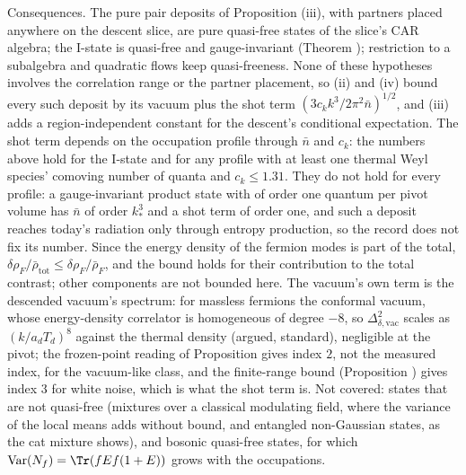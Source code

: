 Consequences. The pure pair deposits of Proposition (iii), with partners placed anywhere on the descent slice, are pure quasi-free states of the slice's CAR algebra; the I-state is quasi-free and gauge-invariant (Theorem ); restriction to a subalgebra and quadratic flows keep quasi-freeness. None of these hypotheses involves the correlation range or the partner placement, so (ii) and (iv) bound every such deposit by its vacuum plus the shot term $(3c_{k}k^{3}/2\pi^{2}\bar n)^{1/2}$, and (iii) adds a region-independent constant for the descent's conditional expectation. The shot term depends on the occupation profile through $\bar n$ and $c_{k}$: the numbers above hold for the I-state and for any profile with at least one thermal Weyl species' comoving number of quanta and $c_{k} \le 1.31$. They do not hold for every profile: a gauge-invariant product state with of order one quantum per pivot volume has $\bar n$ of order $k_{*}^{3}$ and a shot term of order one, and such a deposit reaches today's radiation only through entropy production, so the record does not fix its number. Since the energy density of the fermion modes is part of the total, $\delta\rho_{F}/\bar\rho_{\mathrm{tot}} \le \delta\rho_{F}/\bar\rho_{F}$, and the bound holds for their contribution to the total contrast; other components are not bounded here. The vacuum's own term is the descended vacuum's spectrum: for massless fermions the conformal vacuum, whose energy-density correlator is homogeneous of degree $-8$, so $\Delta_{\delta, \mathrm{vac}}^{2}$ scales as $(k/a_{d}T_{d})^{8}$ against the thermal density (argued, standard), negligible at the pivot; the frozen-point reading of Proposition  gives index $2$, not the measured index, for the vacuum-like class, and the finite-range bound (Proposition ) gives index $3$ for white noise, which is what the shot term is. Not covered: states that are not quasi-free (mixtures over a classical modulating field, where the variance of the local means adds without bound, and entangled non-Gaussian states, as the cat mixture shows), and bosonic quasi-free states, for which $\mathrm{Var}(N_{f}) = \Tr(fEf(1 + E))$ grows with the occupations.

